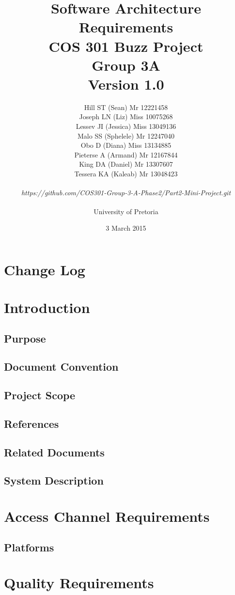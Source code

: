 \documentclass[a4paper]{article}
\title{Software Architecture Requirements 
\\COS 301 Buzz Project
\\Group 3A
\\Version 1.0}
\author{Hill ST (Sean) Mr 12221458 
\\Joseph LN (Liz) Miss 10075268 
\\Lessev JI (Jessica) Miss 13049136
\\Malo SS (Sphelele) Mr 12247040 
\\Obo D (Diana) Miss 13134885 
\\Pieterse A (Armand) Mr 12167844
\\King DA (Daniel) Mr 13307607
\\Tessera KA (Kaleab) Mr 13048423
\\
\\\textit{https://github.com/COS301-Group-3-A-Phase2/Part2-Mini-Project.git}
\\
\\ University of Pretoria}
\date{3 March 2015}
\begin{document}
\maketitle
\newpage


\tableofcontents
\newpage

\section{Change Log}

\section{Introduction}
\subsection{Purpose}
\subsection{Document Convention}
\subsection{Project Scope}
\subsection{References}
\subsection{Related Documents}
\subsection{System Description}

\section{Access Channel Requirements}
\subsection{Platforms}

\section{Quality Requirements}
\end{document}

